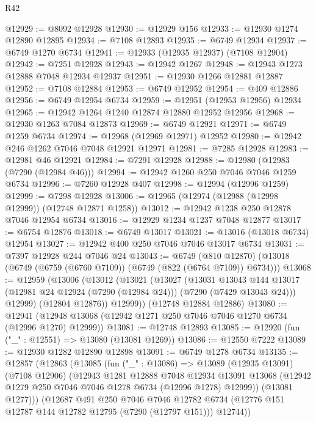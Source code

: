 \begin{lexlean}{R42}
\begin{coremodule}
{@12929 := @8092 @12928
@12930 := @12929 @156
@12933 := @12930 @1274 @12890 @12895
@12934 := @7108 @12893
@12935 := @6749 @12934
@12937 := @6749 @1270 @6734
@12941 := @12933 (@12935 @12937) (@7108 @12904)
@12942 := @7251 @12928
@12943 := @12942 @1267
@12948 := @12943 @1273 @12888 @7048 @12934 @12937
@12951 := @12930 @1266 @12881 @12887
@12952 := @7108 @12884
@12953 := @6749 @12952
@12954 := @409 @12886
@12956 := @6749 @12954 @6734
@12959 := @12951 (@12953 @12956) @12934
@12965 := @12942 @1264 @1240 @12874 @12880 @12952 @12956
@12968 := @12930 @1263 @7084 @12873
@12969 := @6749 @12921
@12971 := @6749 @1259 @6734
@12974 := @12968 (@12969 @12971) @12952
@12980 := @12942 @246 @1262 @7046 @7048 @12921 @12971
@12981 := @7285 @12928
@12983 := @12981 @46 @12921
@12984 := @7291 @12928
@12988 := @12980 (@12983 (@7290 (@12984 @46)))
@12994 := @12942 @1260 @250 @7046 @7046 @1259 @6734
@12996 := @7260 @12928 @407
@12998 := @12994 (@12996 @1259)
@12999 := @7298 @12928
@13006 := @12965 (@12974 (@12988 (@12998 @12999)) (@12748 @12871 @1258))
@13012 := @12942 @1238 @250 @12878 @7046 @12954 @6734
@13016 := @12929 @1234 @1237 @7048 @12877
@13017 := @6754 @12876
@13018 := @6749 @13017
@13021 := @13016 (@13018 @6734) @12954
@13027 := @12942 @400 @250 @7046 @7046 @13017 @6734
@13031 := @7397 @12928 @244 @7046 @24
@13043 := @6749
    (@810 @12870)
    (@13018 (@6749 (@6759 (@6760 @7109)) (@6749 (@822 (@6764 @7109)) @6734)))
@13068 := @12959
    (@13006
      (@13012
        (@13021
          (@13027
            (@13031
              @13043
              @144
              @13017
              (@12981 @24 @12924 (@7290 (@12984 @24)))
              (@7290 (@7429 @13043 @24)))
            @12999)
          (@12804 @12876))
        @12999))
    (@12748 @12884 @12886)
@13080 := @12941 (@12948 @13068 (@12942 @1271 @250 @7046 @7046 @1270 @6734 (@12996 @1270) @12999))
@13081 := @12748 @12893
@13085 := @12920 (fun ("_" : @12551) => @13080 (@13081 @1269))
@13086 := @12550 @7222
@13089 := @12930 @1282 @12890 @12898
@13091 := @6749 @1278 @6734
@13135 := @12857
    (@12863
      (@13085
        (fun ("_" : @13086) =>
        @13089
          (@12935 @13091)
          (@7108 @12906)
          (@12943
            @1281
            @12888
            @7048
            @12934
            @13091
            @13068
            (@12942 @1279 @250 @7046 @7046 @1278 @6734 (@12996 @1278) @12999))
          (@13081 @1277)))
      (@12687
        @491
        @250
        @7046
        @7046
        @12782
        @6734
        (@12776 @151 @12787 @144 @12782 @12795 (@7290 (@12797 @151)))
        @12744))
}
\end{coremodule}
\end{lexlean}
